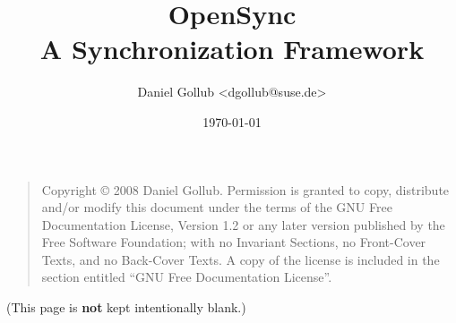 \documentclass[a4paper,10pt,oneside,openright,openbib]{report}
\author{
Daniel Gollub <dgollub@suse.de>\\
}
\title{\huge{OpenSync}\\\large{A Synchronization Framework}}
\date{\today}
\begin{document}
\maketitle

\begin{quote}
Copyright \copyright{}  2008  Daniel Gollub.
Permission is granted to copy, distribute and/or modify this document
under the terms of the GNU Free Documentation License, Version 1.2
or any later version published by the Free Software Foundation;
with no Invariant Sections, no Front-Cover Texts, and no Back-Cover Texts.
A copy of the license is included in the section entitled ``GNU
Free Documentation License''. 
\end{quote}

\vfill
\begin{center}
(This page is \textbf{not} kept intentionally blank.)
\end{center}
\vfill

\tableofcontents

\newpage



















\appendix




\end{document}
